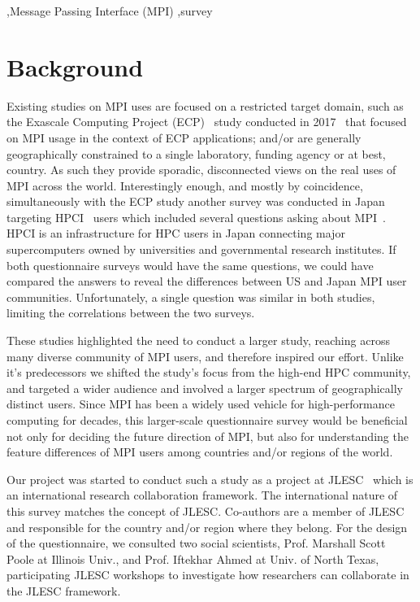 \documentclass[preprint,5p,times]{elsarticle}
\begin{document}
\begin{keyword}
   \sep Message Passing Interface (MPI) \sep survey
\end{keyword}

\maketitle

\section{Background}

Existing studies on MPI uses are focused on a restricted target
domain, such as the Exascale Computing Project (ECP)~\cite{ECP} study
conducted in 2017~\cite{https://doi.org/10.1002/cpe.4851} that focused
on MPI usage in the
context of ECP applications; and/or are generally geographically
constrained to a single laboratory, funding agency or at best,
country. As such they provide sporadic, disconnected views on the real
uses of MPI across the world.
%
Interestingly enough, and mostly by coincidence, simultaneously with
the ECP study another survey was conducted in Japan targeting
HPCI~\cite{HPCI} users which included several questions asking about
MPI~\cite{hpci-user-survey}.  HPCI is an infrastructure for HPC users
in Japan connecting major supercomputers owned by universities and
governmental research institutes. If both questionnaire surveys would
have the same questions, we could have compared the answers to reveal
the differences between US and Japan MPI user
communities. Unfortunately, a single question was similar in both
studies, limiting the correlations between the two surveys.

These studies highlighted the need to conduct a larger study, reaching across
many diverse community of MPI users, and therefore inspired our effort. Unlike
it's predecessors we shifted the study's focus from the high-end HPC community,
and targeted a wider audience and involved a larger spectrum of geographically
distinct users. Since MPI has been a widely used vehicle for high-performance
computing for decades, this larger-scale questionnaire survey would be
beneficial not only for deciding the future direction of MPI, but also for
understanding the feature differences of MPI users among countries and/or
regions of the world.

Our project was started to conduct such a study as a project at
JLESC~\cite{JLESC} which is an international research collaboration
framework. The international nature of this survey matches the concept
of JLESC. Co-authors are a member of JLESC and responsible for the
country and/or region where they belong. For the design of the questionnaire,
we consulted two social scientists, Prof. Marshall Scott Poole at
Illinois Univ., and Prof. Iftekhar Ahmed at Univ. of North Texas,
participating JLESC workshops to investigate how researchers can
collaborate in the JLESC framework.
\end{document}
